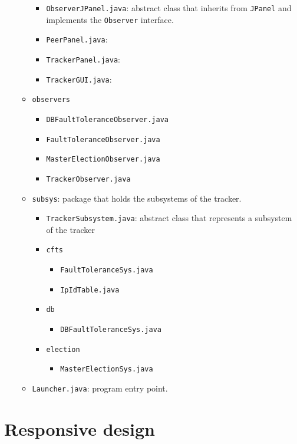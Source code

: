\documentclass[twoside,a4paper,10pt]{article}
\begin{document}
\begin{itemize}
\begin{itemize}
\begin{itemize}
    \item \texttt{ObserverJPanel.java}: abstract class that inherits from
      \texttt{JPanel} and implements the \texttt{Observer} interface.
    \item \texttt{PeerPanel.java}: 
    \item \texttt{TrackerPanel.java}:  
    \item \texttt{TrackerGUI.java}:  
    \end{itemize}
  \item \texttt{observers}
    \begin{itemize}
    \item \texttt{DBFaultToleranceObserver.java}
    \item \texttt{FaultToleranceObserver.java}
    \item \texttt{MasterElectionObserver.java}
    \item \texttt{TrackerObserver.java}
    \end{itemize}
  \item \texttt{subsys}: package that holds the subsystems of the tracker.
    
    \begin{itemize}
    \item \texttt{TrackerSubsystem.java}: abstract class that represents a
      subsystem of the tracker
    \item \texttt{cfts}
      \begin{itemize}
      \item \texttt{FaultToleranceSys.java}
      \item \texttt{IpIdTable.java}
      \end{itemize}
    \item \texttt{db}
      \begin{itemize}
      \item \texttt{DBFaultToleranceSys.java}
      \end{itemize}
    \item \texttt{election}
      \begin{itemize}
      \item \texttt{MasterElectionSys.java}
      \end{itemize}
    \end{itemize}
  \item \texttt{Launcher.java}: program entry point. 
  \end{itemize}
\end{itemize}

\section{Responsive design}
\end{document}
